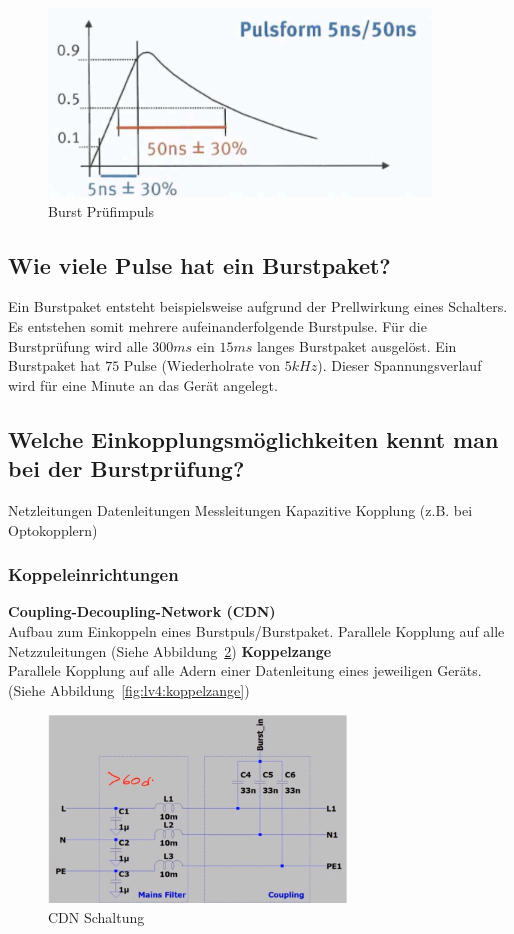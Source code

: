 \begin{figure}
  \centering
  \includegraphics[height=5cm]{src/assets/pictures/lv4_burst_impuls.png}
  \caption{Burst Prüfimpuls}\label{fig:lv4:burst_impuls}
\end{figure}

\subsection{Wie viele Pulse hat ein Burstpaket?}
Ein Burstpaket entsteht beispielsweise aufgrund der Prellwirkung eines Schalters. Es entstehen somit mehrere aufeinanderfolgende Burstpulse.\p
Für die Burstprüfung wird alle \(300ms\) ein \(15ms\) langes Burstpaket ausgelöst. Ein Burstpaket hat \(75\) Pulse (Wiederholrate von \(5kHz\)). Dieser Spannungsverlauf wird für eine Minute an das Gerät angelegt.

\subsection{Welche Einkopplungsmöglichkeiten kennt man bei der Burstprüfung?}
\begin{outline}
  \1 Netzleitungen
  \1 Datenleitungen
  \1 Messleitungen
  \1 Kapazitive Kopplung (z.B. bei Optokopplern)
\end{outline}
%
\subsubsection{Koppeleinrichtungen}
\textbf{Coupling-Decoupling-Network (CDN)}\\
Aufbau zum Einkoppeln eines Burstpuls/Burstpaket. Parallele Kopplung auf alle Netzzuleitungen (Siehe Abbildung~\ref{fig:lv4:cdn})\p
%
\textbf{Koppelzange}\\
Parallele Kopplung auf alle Adern einer Datenleitung eines jeweiligen Geräts. (Siehe Abbildung~\ref{fig:lv4:koppelzange})

\begin{figure}[ht]
  \centering
  \includegraphics[height=5cm]{src/assets/pictures/lv4_CDN.jpeg}
  \caption{CDN Schaltung}\label{fig:lv4:cdn}
\end{figure}

